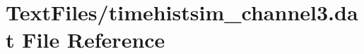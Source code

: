 \hypertarget{TextFiles_2timehistsim__channel3_8dat}{}\section{Text\+Files/timehistsim\+\_\+channel3.dat File Reference}
\label{TextFiles_2timehistsim__channel3_8dat}
